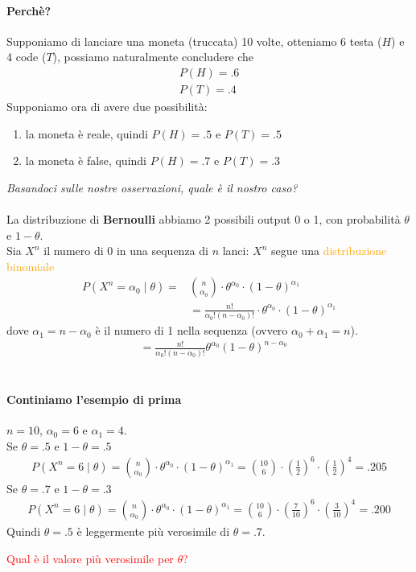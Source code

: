 \documentclass[a4paper,12pt]{article}
\newcommand{\hl}[1]{\textcolor{orange}{#1}}
\begin{document}
\paragraph{Perchè?} Supponiamo di lanciare una moneta (truccata) 10 volte, otteniamo 6 testa ($H$) e 4 code ($T$), possiamo naturalmente concludere che
\begin{align*}
    P(H) = .6 \\
    P(T)=.4
\end{align*}
Supponiamo ora di avere due possibilità:
\begin{enumerate}
    \item la moneta è reale, quindi $P(H)=.5$ e $P(T)=.5$
    \item la moneta è false, quindi $P(H)=.7$ e $P(T)=.3$
\end{enumerate}
\textit{Basandoci sulle nostre osservazioni, quale è il nostro caso?}\\
\vspace{1px}\\
La distribuzione di \textbf{Bernoulli} abbiamo 2 possibili output 0 o 1, con probabilità $\theta$ e $1-\theta$.\\
Sia $X^n$ il numero di 0 in una sequenza di $n$ lanci: $X^n$ segue una \hl{distribuzione binomiale}
\begin{align*}
    P(X^n=\alpha_0 \mid \theta) = & \binom{n}{\alpha_0}\cdot \theta^{\alpha_0}\cdot (1-\theta)^{\alpha_1}\\
    & = \frac{n!}{\alpha_0!(n - \alpha_0)!}\cdot \theta^{\alpha_0}\cdot (1-\theta)^{\alpha_1}
\end{align*}
dove $\alpha_1 = n-\alpha_0$ è il numero di 1 nella sequenza (ovvero $\alpha_0+\alpha_1=n$).
\begin{align*}
    &= \frac{n!}{\alpha_0!(n-\alpha_0)!}\theta^{\alpha_0}(1-\theta)^{n-\alpha_0}
\end{align*}
\vspace{1px}\\
\paragraph{Continiamo l'esempio di prima} $n=10$, $\alpha_0=6$ e $\alpha_1=4$.\\
Se $\theta=.5$ e $1-\theta=.5$
\begin{align*}
    P(X^n=6 \mid \theta) = \binom{n}{\alpha_0}\cdot \theta^{\alpha_0}\cdot (1-\theta)^{\alpha_1} = \binom{10}{6}\cdot \left(\frac{1}{2}\right)^{6}\cdot \left(\frac{1}{2}\right)^{4} = .205
\end{align*}
Se $\theta=.7$ e $1-\theta=.3$
\begin{align*}
    P(X^n=6 \mid \theta) = \binom{n}{\alpha_0}\cdot \theta^{\alpha_0}\cdot (1-\theta)^{\alpha_1} = \binom{10}{6}\cdot \left(\frac{7}{10}\right)^{6}\cdot \left(\frac{3}{10}\right)^{4} = .200
\end{align*}
Quindi $\theta=.5$ è leggermente più verosimile di $\theta=.7$.
\begin{center}
    \textcolor{red}{Qual è il valore più verosimile per $\theta$?}
\end{center}
\end{document}
